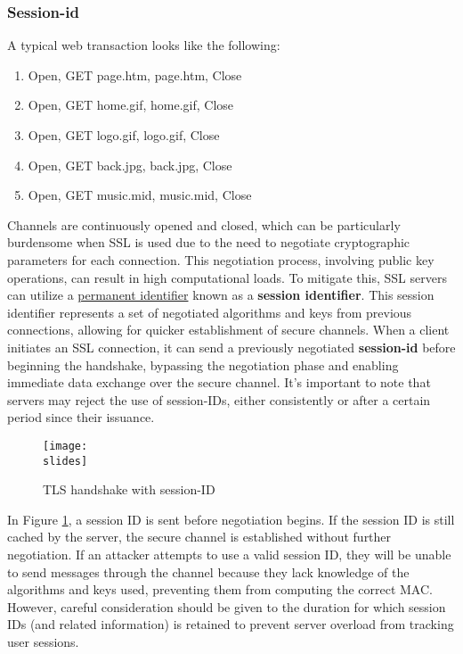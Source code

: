 \subsubsection{Session-id}
A typical web transaction looks like the following:
\begin{enumerate}
    \item Open, GET page.htm, page.htm, Close
    \item Open, GET home.gif, home.gif, Close
    \item Open, GET logo.gif, logo.gif, Close
    \item Open, GET back.jpg, back.jpg, Close
    \item Open, GET music.mid, music.mid, Close
\end{enumerate}

Channels are continuously opened and closed, which can be particularly burdensome when SSL is used due to the need to negotiate cryptographic parameters for each connection. This negotiation process, involving public key operations, can result in high computational loads. To mitigate this, SSL servers can utilize a \underline{permanent identifier} known as a \textbf{session identifier}. This session identifier represents a set of negotiated algorithms and keys from previous connections, allowing for quicker establishment of secure channels. When a client initiates an SSL connection, it can send a previously negotiated \textbf{session-id} before beginning the handshake, bypassing the negotiation phase and enabling immediate data exchange over the secure channel. It's important to note that servers may reject the use of session-IDs, either consistently or after a certain period since their issuance.

\begin{figure}[h]
    \centering
    \texttt{[image: \\slides]}
    \caption{TLS handshake with session-ID}
    \label{fig:tls-handshake-sessionid}
\end{figure}


In Figure \ref{fig:tls-handshake-sessionid}, a session ID is sent before negotiation begins. If the session ID is still cached by the server, the secure channel is established without further negotiation. If an attacker attempts to use a valid session ID, they will be unable to send messages through the channel because they lack knowledge of the algorithms and keys used, preventing them from computing the correct MAC. However, careful consideration should be given to the duration for which session IDs (and related information) is retained to prevent server overload from tracking user sessions.

